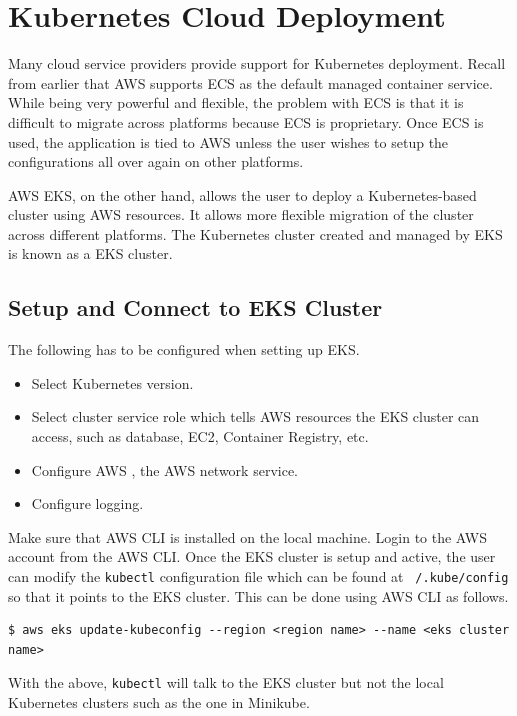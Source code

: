 \section{Kubernetes Cloud Deployment}

Many cloud service providers provide support for Kubernetes deployment. Recall from earlier that AWS supports ECS as the default managed container service. While being very powerful and flexible, the problem with ECS is that it is difficult to migrate across platforms because ECS is proprietary. Once ECS is used, the application is tied to AWS unless the user wishes to setup the configurations all over again on other platforms.

AWS EKS, on the other hand, allows the user to deploy a Kubernetes-based cluster using AWS resources. It allows more flexible migration of the cluster across different platforms. The Kubernetes cluster created and managed by EKS is known as a EKS cluster.

\subsection{Setup and Connect to EKS Cluster} \label{subsec:setupeks}

The following has to be configured when setting up EKS.

\begin{itemize}
  \item Select Kubernetes version.
  \item Select cluster service role which tells AWS resources the EKS cluster can access, such as database, EC2, Container Registry, etc. 
  \item Configure AWS , the AWS network service.
  \item Configure logging.
\end{itemize}

Make sure that AWS CLI is installed on the local machine. Login to the AWS account from the AWS CLI. Once the EKS cluster is setup and active, the user can modify the \verb|kubectl| configuration file which can be found at \texttt{~/.kube/config} so that it points to the EKS cluster. This can be done using AWS CLI as follows.
\begin{lstlisting}
$ aws eks update-kubeconfig --region <region name> --name <eks cluster name>
\end{lstlisting}
With the above, \verb|kubectl| will talk to the EKS cluster but not the local Kubernetes clusters such as the one in Minikube.

